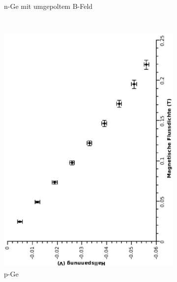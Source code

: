 \documentclass[12pt,a4paper,twopage]{article}
\begin{document}
\begin{figure}[H]
\begin{subfigure}{0.4\textwidth}
\caption{n-Ge mit umgepoltem B-Feld}
\end{subfigure}
\\
\begin{subfigure}{0.4\textwidth}
\includegraphics[width=0.9\linewidth, angle=-90]{ppe.eps}
\caption{p-Ge}
\end{subfigure}
\begin{subfigure}{0.4\textwidth}

\end{subfigure}
\end{figure}
\end{document}
